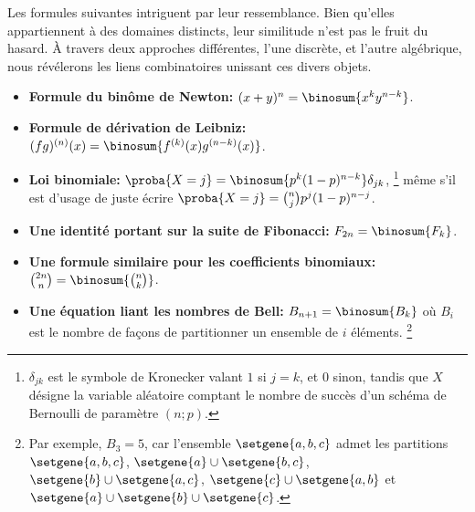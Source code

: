 Les formules suivantes intriguent par leur ressemblance. Bien qu'elles appartiennent à des domaines distincts, leur similitude n’est pas le fruit du hasard. À travers deux approches différentes, l'une discrète, et l'autre algébrique, nous révélerons les liens combinatoires unissant ces divers objets.
%
\begin{itemize}
    \item \textbf{Formule du binôme de Newton:}
    $(x + y)^n = \binosum{x^k y^{n-k}}$.


    \item \textbf{Formule de dérivation de Leibniz:}
    $(fg)^{(n)}(x) = \binosum{f^{(k)}(x) g^{(n-k)}(x)}$.


    \item \textbf{Loi binomiale:}
    $\proba{X = j} = \binosum{p^k (1 - p)^{n-k}} \delta_{jk}$,%
    \footnote{
    	$\delta_{jk}$ est le symbole de Kronecker valant $1$ si $j=k$, et $0$ sinon,
		tandis que
		$X$ désigne la variable aléatoire comptant le nombre de succès d'un schéma de Bernoulli de paramètre $(n ; p)$.
    }
    même s'il est d'usage de juste écrire
    $\proba{X = j} =\binom{n}{j} p^j (1 - p)^{n-j}$.


    \item \textbf{Une identité portant sur la suite de Fibonacci:}
    $F_{2n} = \binosum{F_k}$.


    \item \textbf{Une formule similaire pour les coefficients binomiaux:}
    $\binom{2n}{n} = \binosum{\binom{n}{k}}$.


    \item \textbf{Une équation liant les nombres de Bell:}
    $B_{n+1} = \binosum{B_k}$ où $B_i$ est le nombre de façons de partitionner un ensemble de $i$ éléments.%
    \footnote{
    	Par exemple,
    	$B_3 = 5$,
    	car l'ensemble $\setgene{ a , b , c }$ admet les partitions
    	$\setgene{ a , b , c }$,
    	$\setgene{ a } \cup \setgene{ b , c }$,
    	$\setgene{ b } \cup \setgene{ a , c }$,
    	$\setgene{ c } \cup \setgene{ a , b }$
		et
    	$\setgene{ a } \cup \setgene{ b } \cup \setgene{ c }$.
	}
\end{itemize}